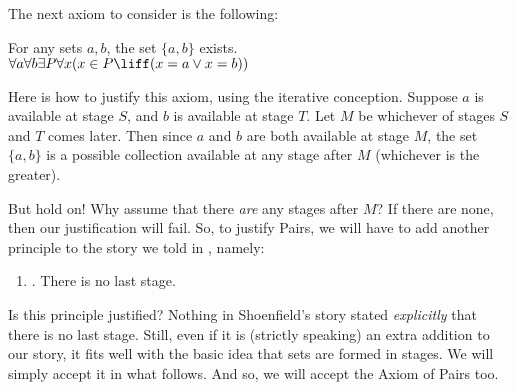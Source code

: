 \documentclass[../../../include/open-logic-section]{subfiles}
\begin{document}
The next axiom to consider is the following:
\begin{axiom*}[Pairs] For any sets $a, b$, the set $\{a, b\}$ exists.\\
	$\forall a \forall b \exists P \forall x (x \in P \liff (x = a \lor x = b))$
\end{axiom*}\noindent 
Here is how to justify this axiom, using the iterative conception. Suppose $a$ is available at stage $S$, and $b$ is available at stage $T$. Let $M$ be whichever of stages $S$ and $T$ comes later. Then since $a$ and $b$ are both available at stage $M$, the set $\{a,b\}$ is a possible collection available at any stage after $M$ (whichever is the greater). 

But hold on!{} Why assume that there \emph{are} any stages after $M$? If there are none, then our justification will fail. So, to justify Pairs, we will have to add another principle to the story we told in , namely:
\begin{enumerate}
	\item[] \stagessucc. There is no last stage.
\end{enumerate}
Is this principle justified? Nothing in Shoenfield's story stated \emph{explicitly} that there is no last stage. Still, even if it is (strictly speaking) an extra addition to our story, it fits well with the basic idea that sets are formed in stages. We will simply accept it in what follows. And so, we will accept the Axiom of Pairs too.
\end{document}
